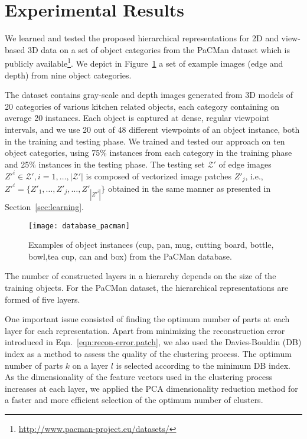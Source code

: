 \documentclass[conference]{IEEEtran}
\begin{document}
\section{Experimental Results}
\label{sec:results}

We learned and tested the proposed hierarchical representations for 2D and view-based 3D data on a set of object categories from the PaCMan dataset which is publicly available\footnote{\url{http://www.pacman-project.eu/datasets/}}. We depict in Figure~\ref{database} a set of example images (edge and depth) from nine object categories. 

The dataset contains gray-scale and depth images generated from 3D models of 20 categories of various kitchen related objects, each category containing on average 20 instances. Each object is captured at dense, regular viewpoint intervals, and we use 20 out of 48 different viewpoints of an object instance, both in the training and testing phase. We trained and tested our approach on ten object categories, using 75\% instances from each category in the training phase and 25\% instances in the testing phase. The testing set $\mathcal{Z'}$ of edge images $Z'^i \in \mathcal{Z'}, i=1,\ldots,|\mathcal{Z'}|$ is composed of vectorized image patches $Z'_j$, i.e., $Z'^i=\{Z'_1,\ldots,Z'_j,\ldots,Z'_{|Z'^i|}\}$ obtained in the same manner as presented in Section~\ref{sec:learning}.

\begin{figure}
\begin{center}
\texttt{[image: database\_pacman]}
\end{center}
\caption{Examples of object instances (cup, pan, mug, cutting board, bottle, bowl,tea cup, can and box) from the PaCMan database.}
\label{database}
\end{figure}

The number of constructed layers in a hierarchy depends on the size of the training objects. For the PaCMan dataset, the hierarchical representations are formed of five layers. 

One important issue consisted of finding the optimum number of parts at each layer for each representation. Apart from minimizing the reconstruction error introduced in Eqn.~\ref{eqn:recon-error.patch}, we also used the Davies-Bouldin (DB) index \cite{Bouldin97} as a method to assess the quality of the clustering process. The optimum number of parts $k$ on a layer $l$ is selected according to the minimum DB index. As the dimensionality of the feature vectors used in the clustering process increases at each layer, we applied the PCA dimensionality reduction method for a faster and more efficient selection of the optimum number of clusters.
\end{document}
